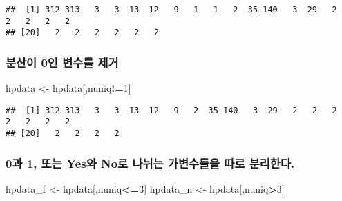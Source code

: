 \documentclass[
]{article}
\newenvironment{Shaded}{\begin{snugshade}}{\end{snugshade}}
\newcommand{\CommentTok}[1]{\textcolor[rgb]{0.56,0.35,0.01}{\textit{#1}}}
\newcommand{\ControlFlowTok}[1]{\textcolor[rgb]{0.13,0.29,0.53}{\textbf{#1}}}
\newcommand{\DecValTok}[1]{\textcolor[rgb]{0.00,0.00,0.81}{#1}}
\newcommand{\KeywordTok}[1]{\textcolor[rgb]{0.13,0.29,0.53}{\textbf{#1}}}
\newcommand{\NormalTok}[1]{#1}
\newcommand{\OperatorTok}[1]{\textcolor[rgb]{0.81,0.36,0.00}{\textbf{#1}}}
\newcommand{\StringTok}[1]{\textcolor[rgb]{0.31,0.60,0.02}{#1}}
\begin{document}
\begin{verbatim}
##  [1] 312 313   3   3  13  12   9   1   1   2  35 140   3  29   2   2   2   2   2
## [20]   2   2   2   2   2   2
\end{verbatim}

\hypertarget{uxbd84uxc0b0uxc774-0uxc778-uxbcc0uxc218uxb97c-uxc81cuxac70}{%
\subsubsection{분산이 0인 변수를
제거}\label{uxbd84uxc0b0uxc774-0uxc778-uxbcc0uxc218uxb97c-uxc81cuxac70}}

\begin{Shaded}
\begin{Highlighting}[]
\NormalTok{hpdata <-}\StringTok{ }\NormalTok{hpdata[,nuniq}\OperatorTok{!=}\DecValTok{1}\NormalTok{]}
\end{Highlighting}
\end{Shaded}

\begin{Shaded}
\end{Shaded}

\begin{verbatim}
##  [1] 312 313   3   3  13  12   9   2  35 140   3  29   2   2   2   2   2   2   2
## [20]   2   2   2   2
\end{verbatim}

\hypertarget{uxacfc-1-uxb610uxb294-yesuxc640-nouxb85c-uxb098uxb258uxb294-uxac00uxbcc0uxc218uxb4e4uxc744-uxb530uxb85c-uxbd84uxb9acuxd55cuxb2e4.}{%
\subsubsection{0과 1, 또는 Yes와 No로 나뉘는 가변수들을 따로
분리한다.}\label{uxacfc-1-uxb610uxb294-yesuxc640-nouxb85c-uxb098uxb258uxb294-uxac00uxbcc0uxc218uxb4e4uxc744-uxb530uxb85c-uxbd84uxb9acuxd55cuxb2e4.}}

\begin{Shaded}
\begin{Highlighting}[]
\NormalTok{hpdata_f <-}\StringTok{ }\NormalTok{hpdata[,nuniq}\OperatorTok{<=}\DecValTok{3}\NormalTok{]}
\NormalTok{hpdata_n <-}\StringTok{ }\NormalTok{hpdata[,nuniq}\OperatorTok{>}\DecValTok{3}\NormalTok{]}
\end{Highlighting}
\end{Shaded}
\end{document}
